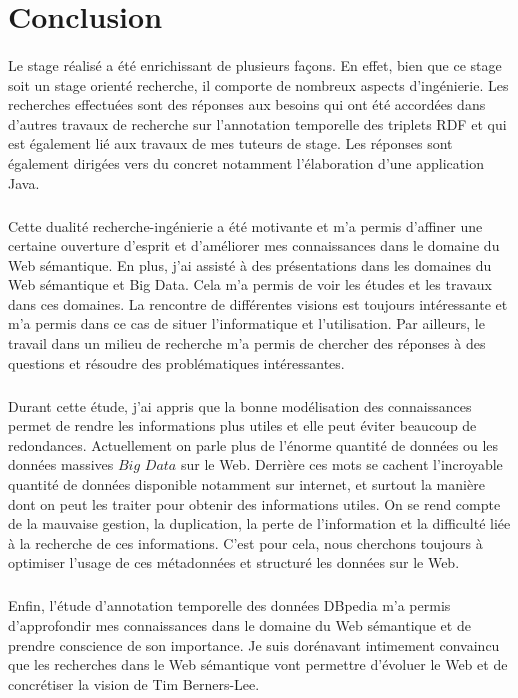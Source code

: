 \section*{Conclusion}
\paragraph{}
Le stage réalisé a été enrichissant de plusieurs façons. En effet, bien que ce stage soit un stage orienté recherche, il comporte de nombreux aspects d'ingénierie. Les recherches effectuées sont des réponses aux besoins qui ont été accordées dans d'autres travaux de recherche sur l'annotation temporelle des triplets RDF et qui est également lié aux travaux de mes tuteurs de stage. Les réponses sont également dirigées vers du concret notamment l'élaboration d'une application Java. 
\subparagraph{}
Cette dualité recherche-ingénierie a été motivante et m'a permis d'affiner une certaine ouverture d'esprit et d'améliorer mes connaissances dans le domaine du Web sémantique.
En plus, j'ai assisté à des présentations dans les domaines du Web sémantique et Big Data. Cela m'a permis de voir les études et les travaux dans ces domaines. La rencontre de différentes visions est toujours intéressante et m'a permis dans ce cas de situer l'informatique et l'utilisation. Par ailleurs, le travail dans un milieu de recherche m'a permis de chercher des réponses à des questions et résoudre des problématiques intéressantes.
\subparagraph{}
Durant cette étude, j'ai appris que la bonne modélisation des connaissances permet de rendre les informations plus utiles et elle peut éviter beaucoup de redondances. Actuellement on parle plus de l'énorme quantité de données ou les données massives $Big$ $Data$ sur le Web. Derrière ces mots se cachent l’incroyable quantité de données disponible notamment sur internet, et surtout la manière dont on peut les traiter pour obtenir des informations utiles. On se rend compte de la mauvaise gestion, la duplication, la perte de l'information et la difficulté liée à la recherche de ces informations. C'est pour cela, nous cherchons toujours à optimiser l'usage de ces métadonnées et structuré les données sur le Web.
\subparagraph{}
Enfin, l'étude d'annotation temporelle des données DBpedia m'a permis d'approfondir mes connaissances dans le domaine du Web sémantique et de prendre conscience de son importance. Je suis dorénavant intimement convaincu que les recherches dans le Web sémantique vont permettre d'évoluer le Web et de concrétiser la vision de Tim Berners-Lee.   
